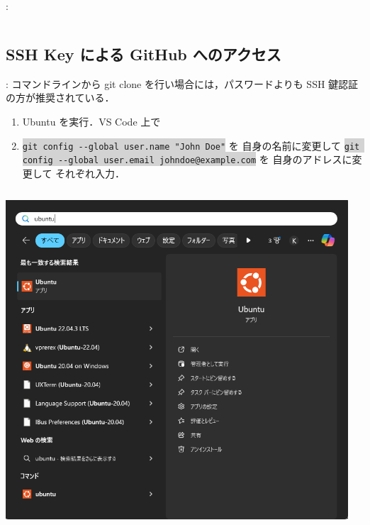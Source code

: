 \documentclass[aspectratio=169,dvipdfmx,cjk]{beamer}
\newcommand{\cmdline}[1]{
    \colorbox{lightgray}{\lstinline[style=command]{#1}}
}
\newcommand{\blue}[1]{ {\color{blue} #1} }
\begin{document}
\begin{frame}{\insertsection \thesubsection: \insertsubsection}
\begin{columns}
\begin{column}{0.5\textwidth}
    \end{column}
  \end{columns}
\end{frame}

\subsection*{SSH Key による GitHub へのアクセス}
\begin{frame}{\insertsection \thesubsection: \insertsubsection}
  コマンドラインから git clone を行い場合には，パスワードよりも SSH 鍵認証の方が推奨されている．
  \begin{enumerate}
    \item Ubuntu を実行．VS Code 上で
    \item \cmdline{git config --global user.name "John Doe"} を\blue{自身の名前に変更して} \cmdline{git config --global user.email johndoe@example.com} を\blue{自身のアドレスに変更して}それぞれ入力\cite{GitBook}．
  \end{enumerate}
  \begin{columns}
    \begin{column}{0.2\textwidth}
        \includegraphics[width=1.0\linewidth]{fig/start-ubuntu.png}
    \end{column}
    \begin{column}{0.3\textwidth}

\end{column}
\end{columns}
\end{frame}
\end{document}
